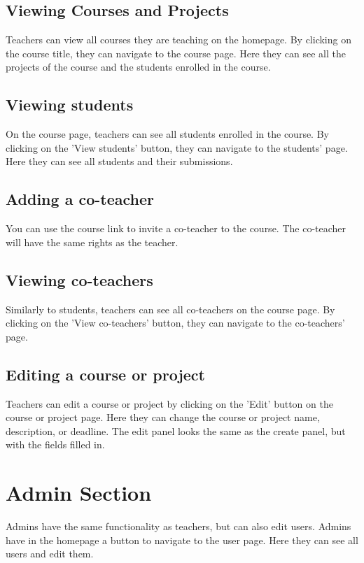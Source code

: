 \documentclass{article}
\begin{document}
\subsection{Viewing Courses and Projects}
Teachers can view all courses they are teaching on the homepage. By clicking on the course title, they can navigate to the course page. Here they can see all the projects of the course and the students enrolled in the course.

\subsection{Viewing students}
On the course page, teachers can see all students enrolled in the course. By clicking on the 'View students' button, they can navigate to the students' page. Here they can see all students and their submissions.

\subsection{Adding a co-teacher}
You can use the course link to invite a co-teacher to the course. The co-teacher will have the same rights as the teacher.

\subsection{Viewing co-teachers}
Similarly to students, teachers can see all co-teachers on the course page. By clicking on the 'View co-teachers' button, they can navigate to the co-teachers' page.

\subsection{Editing a course or project}
Teachers can edit a course or project by clicking on the 'Edit' button on the course or project page. Here they can change the course or project name, description, or deadline. The edit panel looks the same as the create panel, but with the fields filled in.

\section{Admin Section}

Admins have the same functionality as teachers, but can also edit users. Admins have in the homepage a button to navigate to the user page. Here they can see all users and edit them.
\end{document}

